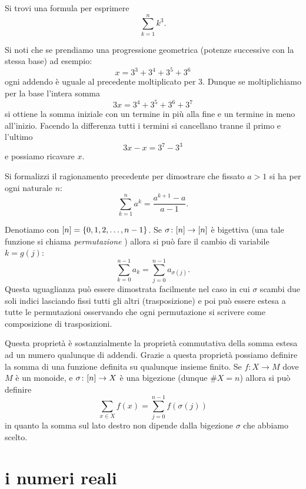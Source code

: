 \begin{exercise}
  Si trovi una formula per esprimere
  \[
  \sum_{k=1}^n k^3.
  \]
\end{exercise}

\begin{exercise}
Si noti che se prendiamo una progressione geometrica 
(potenze successive con la stessa base) 
ad esempio:
\[
  x = 3^3 + 3^4 + 3^5 + 3^6
\]
ogni addendo è uguale al precedente moltiplicato per $3$.
Dunque se moltiplichiamo per la base l'intera somma
\[
  3x = 3^4 + 3^5 + 3^6 + 3^7
\]
si ottiene la somma iniziale con un termine in più alla fine 
e un termine in meno all'inizio. 
Facendo la differenza tutti i termini si cancellano tranne 
il primo e l'ultimo
\[
 3x - x = 3^7 - 3^3  
\]
e possiamo ricavare $x$.

Si formalizzi il ragionamento precedente per dimostrare che 
fissato $a>1$ si ha per ogni naturale $n$:
  \[
    \sum_{k=1}^n a^k = \frac{a^{k+1}-a}{a-1}.  
  \] 
\end{exercise}

Denotiamo con ${\left[ n \right]} = {\left\{ 0,1,2, \dots, n-1 \right\}}$.
Se $\sigma\colon {\left[ n \right]} \to {\left[ n \right]}$
è bigettiva (una tale funzione si chiama \emph{permutazione}%
%
)
allora si può fare il cambio di variabile $k=g(j)$:
\[
    \sum_{k=0}^{n-1} a_k = \sum_{j=0}^{n-1} a_{\sigma(j)}.
\]
Questa uguaglianza può essere dimostrata facilmente nel caso 
in cui $\sigma$ scambi due soli indici lasciando fissi tutti gli altri 
(trasposizione) e poi può essere estesa a tutte le permutazioni
osservando che ogni permutazione si scrivere come composizione 
di trasposizioni.

Questa proprietà è sostanzialmente la proprietà commutativa della somma 
estesa ad un numero qualunque di addendi.
Grazie a questa proprietà possiamo definire la somma di una funzione 
definita su qualunque insieme finito. 
Se $f\colon X \to M$
dove $M$ è un monoide, 
e $\sigma\colon {\left[ n \right]} \to X$ è una bigezione (dunque $\#X = n$)
allora si può definire 
\[
  \sum_{x\in X} f(x) = \sum_{j=0}^{n-1} f(\sigma(j))  
\]
in quanto la somma sul lato destro non dipende dalla bigezione $\sigma$ che 
abbiamo scelto.

\section{i numeri reali}


